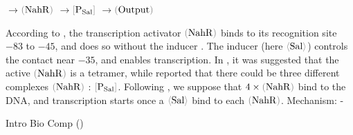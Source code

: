 \documentclass[12pt]{article}
\newcommand{\cbra}[1]{{\color{gray}\ensuremath{#1}}}
\newcommand{\signal}[1]{\ensuremath{\cbra{\langle}\mathrm{#1}\cbra{\rangle}}}
\newcommand{\protein}[1]{\ensuremath{\cbra{(}\mathrm{#1}\cbra{)}}}
\newcommand{\promoter}[1]{\ensuremath{\cbra{[}\mathrm{#1}\cbra{]}}}
\newcommand{\act}{\ensuremath{\to}}
\def\[#1\]{\begin{align}\textstyle#1\end{align}}
\begin{document}
\[
	\signal{Sal} \act \protein{NahR} \act \promoter{P_{Sal}} \act \protein{Output}
\]



According to 
\cite{SchellWender1986},
the transcription activator \protein{NahR}
binds to its recognition site
$-83$ to $-45$,
and does so without the inducer \cite[p.10837]{HuangSchell1991}.
%
The inducer
(here \signal{Sal})
controls the contact near $-35$,
and
enables transcription.
%
%
In \cite{SchellBrownRaju1990},
it was suggested 
that the active \protein{NahR} is a tetramer,
while \cite{ParkLimShin2005}
reported that 
there could be three different complexes
\protein{NahR} : \promoter{P_{Sal}}.
%
%
Following \cite{Peking2013},
we suppose
that 
$4 \times \protein{NahR}$ bind to the DNA,
and
transcription starts
once
a $\signal{Sal}$
bind to each \protein{NahR}.
%
%
Mechanism:
\[
	--
\]



\footnotesize



\leavevmode\vfill{\tiny\color{lightgray}\hfill{Intro Bio Comp (\DTMnow)}}
\end{document}
